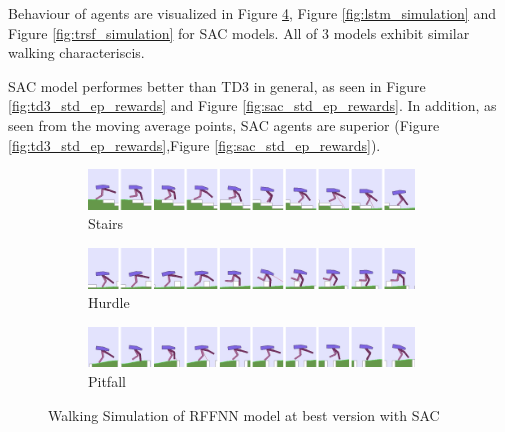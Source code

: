 \documentclass[a4paper, 12pt]{article} %
\begin{document}
Behaviour of agents are visualized in Figure \ref{fig:rffnn_simulation}, Figure \ref{fig:lstm_simulation} and Figure \ref{fig:trsf_simulation} for SAC models. 
All of 3 models exhibit similar walking characteriscis.

SAC model performes better than TD3 in general, as seen in Figure \ref{fig:td3_std_ep_rewards} and Figure \ref{fig:sac_std_ep_rewards}. 
In addition, as seen from the moving average points, SAC agents are superior (Figure \ref{fig:td3_std_ep_rewards},Figure \ref{fig:sac_std_ep_rewards}).

\begin{figure}[!ht]
	\centering
	\begin{subfigure}{.95\textwidth}
		\centering
		\includegraphics[width=0.95\textwidth]{figures/bipedal/anim/ff-stairs.png}
		\caption{Stairs}
		\label{fig:anim_rffnn_stairs}
	\end{subfigure}
	\begin{subfigure}{.95\textwidth}
		\centering
		\includegraphics[width=0.95\textwidth]{figures/bipedal/anim/ff-hurdle.png}
		\caption{Hurdle}
		\label{fig:anim_rffnn_hurdle}
	\end{subfigure}
	\begin{subfigure}{.95\textwidth}
		\centering
		\includegraphics[width=0.95\textwidth]{figures/bipedal/anim/ff-pitfall.png}
		\caption{Pitfall}
		\label{fig:anim_rffnn_pitfall}
	\end{subfigure}
	\caption{Walking Simulation of RFFNN model at best version with SAC}
	\label{fig:rffnn_simulation}
\end{figure}
\end{document}
